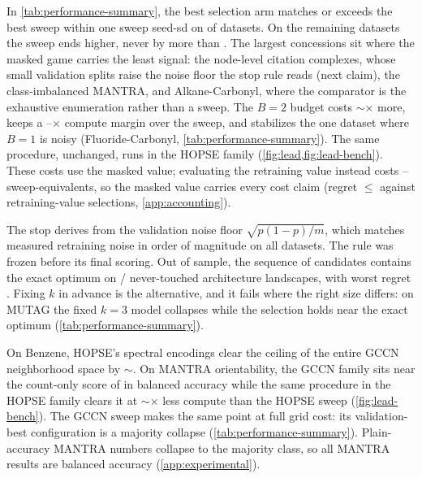  In \cref{tab:performance-summary}, the best
selection arm matches or exceeds the best sweep within one sweep
seed-sd on \unfrozen{\ResSelWithinRows} of
\unfrozen{\ResSelTotalRows} datasets. On the remaining datasets the
sweep ends higher, never by more than \unfrozen{\ResSelMaxSweepGap}.
The largest concessions sit where the masked game carries the least
signal: the node-level citation complexes, whose small validation
splits raise the noise floor the stop rule reads (next claim), the
class-imbalanced MANTRA, and Alkane-Carbonyl, where the comparator is
the exhaustive enumeration rather than a sweep. The
$B{=}2$ budget costs
$\sim$\unfrozen{\ResLadderBTwoCostMult}$\times$ more, keeps a
\unfrozen{\ResSweepVsBTwoMin}--\unfrozen{\ResSweepVsBTwoMax}$\times$
compute margin over the sweep, and stabilizes the one dataset where
$B{=}1$ is noisy (Fluoride-Carbonyl,
\cref{tab:performance-summary}). The same procedure, unchanged, runs
in the HOPSE family (\cref{fig:lead,fig:lead-bench}). These
costs use the masked value; evaluating the retraining value instead
costs \unfrozen{\ResSweepEqMin}--\unfrozen{\ResSweepEqMax}
sweep-equivalents, so the masked value carries every cost claim
(regret $\le$ \unfrozen{\ResRegretMax} against retraining-value
selections, \cref{app:accounting}).

The stop derives from the validation noise floor $\sqrt{p(1-p)/m}$,
which matches measured retraining noise in order of magnitude on all
\unfrozen{\ResBinomOrderDatasets} datasets. The rule was frozen before
its final scoring. Out of sample, the sequence of candidates contains
the exact optimum on
\unfrozen{\ResLadderOOSContained}/\unfrozen{\ResLadderOOSTotal}
never-touched architecture landscapes, with worst regret
\unfrozen{\ResLadderOOSWorstRegret}. Fixing $k$ in advance is the
alternative, and it fails where the right size differs: on MUTAG the
fixed $k{=}3$ model collapses while the selection holds near the
exact optimum (\cref{tab:performance-summary}).

 On Benzene, HOPSE's spectral
encodings clear the ceiling of the entire GCCN neighborhood space by
$\sim$\unfrozen{\ResBenzeneSpectralMargin}. On MANTRA orientability,
the GCCN family sits near the count-only score of
\unfrozen{\ResCountingCeiling} in balanced accuracy while the same
procedure in the HOPSE family clears it at
$\sim$\unfrozen{\ResMantraSweepVsLadderMult}$\times$ less compute
than the HOPSE sweep (\cref{fig:lead-bench}). The GCCN sweep makes
the same point at full grid cost: its validation-best configuration
is a majority collapse (\cref{tab:performance-summary}). Plain-accuracy MANTRA
numbers collapse to the majority class, so all MANTRA results are
balanced accuracy (\cref{app:experimental}).

